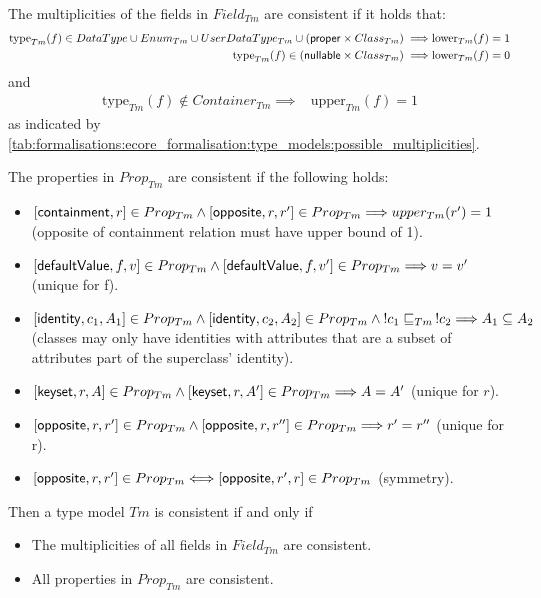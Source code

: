 \begin{defin}
\label{defin:formalisations:ecore_formalisation:type_models:type_model_consistency}
The multiplicities of the fields in $Field_{Tm}$ are consistent if it holds that:
\begin{align*}
    \mathrm{type}_{Tm}(f) \in DataType \cup Enum_{Tm} \cup UserDataType_{Tm} \cup (\mathsf{proper} \times Class_{Tm}) \implies & \mathrm{lower}_{Tm}(f) = 1 \\
    \mathrm{type}_{Tm}(f) \in (\mathsf{nullable} \times Class_{Tm}) \implies & \mathrm{lower}_{Tm}(f) = 0
\end{align*}
and
\begin{align*}
    \mathrm{type}_{Tm}(f) \not\in Container_{Tm} \implies & \mathrm{upper}_{Tm}(f) = 1
\end{align*}
as indicated by \cref{tab:formalisations:ecore_formalisation:type_models:possible_multiplicities}.

The properties in $Prop_{Tm}$ are consistent if the following holds:
\begin{itemize}
    \item $[ \mathsf{containment}, r ] \in Prop_{Tm} \land [ \mathsf{opposite}, r, r' ] \in Prop_{Tm} \Longrightarrow upper_{Tm}(r') = 1$ (opposite of containment relation must have upper bound of 1).
    \item $[ \mathsf{defaultValue}, f, v ] \in Prop_{Tm} \land [ \mathsf{defaultValue}, f, v' ] \in Prop_{Tm} \Longrightarrow v = v'$ (unique for f).
    \item $[ \mathsf{identity}, c_1, A_1 ] \in Prop_{Tm} \land [ \mathsf{identity}, c_2, A_2 ] \in Prop_{Tm}\: \land\: !c_1 \sqsubseteq_{Tm}\, !c_2 \Longrightarrow A_1 \subseteq A_2$ (classes may only have identities with attributes that are a subset of attributes part of the superclass' identity).
    \item $[ \mathsf{keyset}, r, A ] \in Prop_{Tm} \land [ \mathsf{keyset}, r, A' ] \in Prop_{Tm} \Longrightarrow A = A'$ (unique for $r$).
    \item $[ \mathsf{opposite}, r, r' ] \in Prop_{Tm} \land [ \mathsf{opposite}, r, r'' ] \in Prop_{Tm} \Longrightarrow r' = r''$ (unique for r).
    \item $[ \mathsf{opposite}, r, r' ] \in Prop_{Tm} \Longleftrightarrow [ \mathsf{opposite}, r', r ] \in Prop_{Tm}$ (symmetry).
\end{itemize}

Then a type model $Tm$ is consistent if and only if
\begin{itemize}
\item The multiplicities of all fields in $Field_{Tm}$ are consistent.
\item All properties in $Prop_{Tm}$ are consistent.
\end{itemize}

\end{defin}